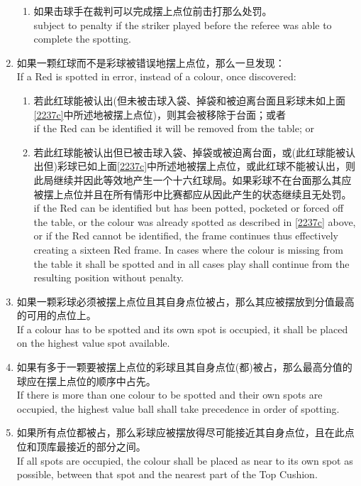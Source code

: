\begin{enumerate}[label=(\alph*)]
\begin{enumerate}[label=(\roman*)]
        \item 如果击球手在裁判可以完成摆上点位前击打那么处罚。\\
        subject to penalty if the striker played before the referee was able to complete the spotting.
    \end{enumerate}
    \item 如果一颗红球而不是彩球被错误地摆上点位，那么一旦发现：\\
    If a Red is spotted in error, instead of a colour, once discovered:
    \begin{enumerate}[label=(\roman*)]
        \item 若此红球能被认出(但未被击球入袋、掉袋和被迫离台面且彩球未如上面\ref{2237c}中所述地被摆上点位)，则其会被移除于台面；或者\\
        if the Red can be identified it will be removed from the table; or
        \item 若此红球能被认出但已被击球入袋、掉袋或被迫离台面，或(此红球能被认出但)彩球已如上面\ref{2237c}中所述地被摆上点位，或此红球不能被认出，则此局继续并因此等效地产生一个十六红球局。如果彩球不在台面那么其应被摆上点位并且在所有情形中比赛都应从因此产生的状态继续且无处罚。\\
        if the Red can be identified but has been potted, pocketed or forced off the table, or the colour was already spotted as described in \ref{2237c} above, or if the Red cannot be identified, the frame continues thus effectively creating a sixteen Red frame. In cases where the colour is missing from the table it shall be spotted and in all cases play shall continue from the resulting position without penalty.
    \end{enumerate}
    \item 如果一颗彩球必须被摆上点位且其自身点位被占，那么其应被摆放到分值最高的可用的点位上。\\
    If a colour has to be spotted and its own spot is occupied, it shall be placed on the highest value spot available.
    \item 如果有多于一颗要被摆上点位的彩球且其自身点位(都)被占，那么最高分值的球应在摆上点位的顺序中占先。\\
    If there is more than one colour to be spotted and their own spots are occupied, the highest value ball shall take precedence in order of spotting.
    \item 如果所有点位都被占，那么彩球应被摆放得尽可能接近其自身点位，且在此点位和顶库最接近的部分之间。\\
    If all spots are occupied, the colour shall be placed as near to its own spot as possible, between that spot and the nearest part of the Top Cushion.

\end{enumerate}
